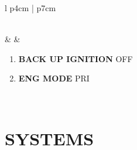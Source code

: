 \documentclass[8pt,usenames,dvipsnames,twoside]{article}
\begin{document}
\begin{center}
\begin{longtable}{l p{4cm} | p{7cm}}
\begin{minipage}[t]{\linewidth}
				\end{minipage} \\
				\midrule
				\textbullet &  &
				\begin{minipage}[t]{\linewidth}
					\vspace{-7pt}
					\begin{enumerate}[label=(\alph*)]
						\item \textbf{BACK UP IGNITION} \dotfill OFF
						\item \textbf{ENG MODE} \dotfill PRI
					\end{enumerate}
				\end{minipage} \\
				\bottomrule
			\end{longtable}
		\end{center}
	
		\cleardoublepage
		
		\section{SYSTEMS}
		
\end{document}
